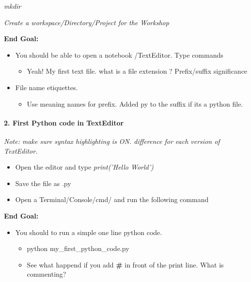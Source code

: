 \documentclass[11pt]{article}
\providecommand{\tightlist}{%
      \setlength{\itemsep}{0pt}\setlength{\parskip}{0pt}}
\begin{document}
\emph{mkdir }

\emph{Create a workspace/Directory/Project for the Workshop}

\textbf{End Goal:}

\begin{itemize}
\tightlist
\item
  You should be able to open a notebook /TextEditor. Type commands

  \begin{itemize}
  \tightlist
  \item
    Yeah! My first text file. what is a file extension ? Prefix/suffix
    significance
  \end{itemize}
\item
  File name etiquettes.

  \begin{itemize}
  \tightlist
  \item
    Use meaning names for prefix. Added py to the suffix if its a python
    file.
  \end{itemize}
\end{itemize}

    \paragraph{2. First Python code in
TextEditor}\label{first-python-code-in-texteditor}

\emph{Note: make sure syntax highlighting is ON. difference for each
version of TextEditor.}

\begin{itemize}
\item
  Open the editor and type \emph{print('Hello World')}
\item
  Save the file as .py
\item
  Open a Terminal/Console/cmd/ and run the following command
\end{itemize}

\textbf{End Goal:}

\begin{itemize}
\tightlist
\item
  You should to run a simple one line python code.

  \begin{itemize}
  \tightlist
  \item
    python my\_first\_python\_code.py
  \item
    See what happend if you add \textbf{\#} in front of the print line.
    What is commenting?
  \end{itemize}
\end{itemize}
\end{document}
